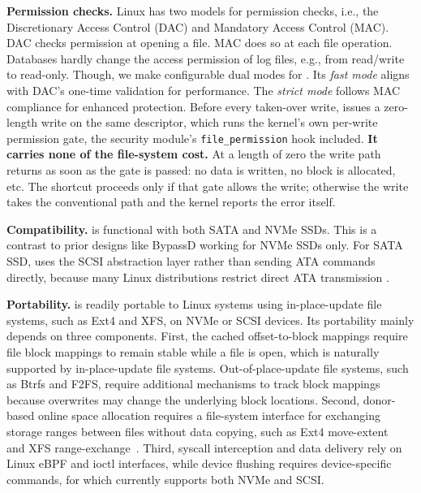 {\bf Permission checks.} 
 Linux has two models for     permission checks, i.e., the Discretionary
Access Control (DAC) and Mandatory Access Control (MAC). 
DAC checks   permission   at
opening a file. MAC does so at each file operation.
Databases hardly change the access permission of log files, e.g., from read/write to read-only.
Though, we
make  configurable dual modes for \odes.
Its {\em fast mode} aligns  with DAC's one-time validation for   performance.
The {\em strict mode} follows MAC compliance for enhanced protection.
Before every taken-over write, \odes issues a zero-length write on the same descriptor,
which runs the kernel's own per-write permission gate, the security module's
\texttt{file\_permission} hook included.
\textbf{It carries none of the file-system cost.}
At a length of zero the write path returns as soon as the gate is passed: no data is
written, no block is allocated, etc.
The shortcut proceeds only if that gate allows the write; otherwise the write takes the
conventional path and the kernel reports the error itself.

{\bf Compatibility.}
\odes   is  functional with both SATA and NVMe SSDs. This is a contrast to prior designs like BypassD working for NVMe SSDs only.
For SATA SSD, \odes uses the SCSI abstraction layer rather than sending ATA commands directly,
 because many Linux distributions restrict direct ATA transmission \cite{libATADe51:online}. 

{\bf Portability.} \odes is readily portable to Linux systems using in-place-update file systems, such as Ext4 and XFS, on NVMe or SCSI devices. Its portability mainly depends on three components. First, the cached offset-to-block mappings require file block mappings to remain stable while a file is open, which is naturally supported by in-place-update file systems. Out-of-place-update file systems, such as Btrfs and F2FS, require additional mechanisms to track block mappings because overwrites may change the underlying block locations. Second, donor-based online space allocation requires a file-system interface for exchanging storage ranges between files without data copying, such as Ext4 move-extent~\cite{ext4moveextent} and XFS range-exchange~\cite{xfs-exchange-range}. Third, syscall interception and data delivery rely on Linux eBPF and ioctl interfaces, while device flushing requires device-specific commands, for which \odes currently supports both NVMe and SCSI. 

